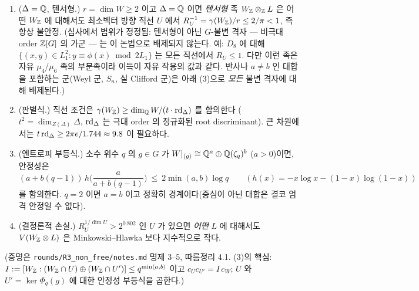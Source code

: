 \begin{proposition}[No-go 정리들]\label{prop:nogo}\tagP
\begin{enumerate}
\item ($\Delta=\mathbb{Q}$, 텐서형.) $r=\dim W\ge2$ 이고 $\Delta=\mathbb{Q}$ 이면 \emph{텐서형} 족 $W_{\mathbb{Z}}\otimes_{\mathbb{Z}} L$ 은 어떤 $W_{\mathbb{Z}}$ 에 대해서도 최소벡터 방향 직선 $U$ 에서 $R_U^{-1}=\gamma(W_{\mathbb{Z}})/r\le 2/\pi<1$, 즉 항상 불안정. (심사에서 범위가 정정됨: 텐서형이 아닌 $G$-불변 격자 --- 비극대 order $\mathbb{Z}[G]$ 의 가군 --- 는 이 논법으로 배제되지 않는다. 예: $D_8$ 에 대해 $\{(x,y)\in L_1^2: y\equiv\phi(x)\bmod 2L_1\}$ 는 모든 직선에서 $R_U\le1$. 다만 이런 족은 자유 $\mu_4$/$\mu_6$ 족의 부분족이라 이득이 자유 작용의 값과 같다. 반사나 $a\ne b$ 인 대합을 포함하는 군(Weyl 군, $S_n$, 실 Clifford 군)은 아래 (3)으로 \emph{모든} 불변 격자에 대해 배제된다.)
\item (판별식.) 직선 조건은 $\gamma(W_{\mathbb{Z}})\ge\dim_{\mathbb{Q}} W/(t\cdot\mathrm{rd}_\Delta)$ 를 함의한다 ($t^2=\dim_{Z(\Delta)}\Delta$, $\mathrm{rd}_\Delta$ 는 극대 order 의 정규화된 root discriminant). 큰 차원에서는 $t\,\mathrm{rd}_\Delta\ge 2\pi e/1.744\approx 9.8$ 이 필요하다.
\item (엔트로피 부등식.) 소수 위수 $q$ 의 $g\in G$ 가 $W|_{\langle g\rangle}\cong\mathbb{Q}^a\oplus\mathbb{Q}(\zeta_q)^b$ ($a>0$)이면, 안정성은
\[(a+b(q-1))\,h\!\Big(\frac a{a+b(q-1)}\Big)\ \le\ 2\min(a,b)\log q\qquad(h(x)=-x\log x-(1-x)\log(1-x))\]
를 함의한다. $q=2$ 이면 $a=b$ 이고 정확히 경계이다(중심이 아닌 대합은 결코 엄격 안정일 수 없다).
\item (결정론적 손실.) $R_U^{1/\dim U}>2^{0.802}$ 인 $U$ 가 있으면 \emph{어떤} $L$ 에 대해서도 $V(W_{\mathbb{Z}}\otimes L)$ 은 Minkowski--Hlawka 보다 지수적으로 작다.
\end{enumerate}
\end{proposition}
(증명은 \texttt{rounds/R3\_non\_free/notes.md} 명제 3--5, 따름정리 4.1. (3)의 핵심: $I:=[W_{\mathbb{Z}}:(W_{\mathbb{Z}}\cap U)\oplus(W_{\mathbb{Z}}\cap U')]\le q^{\min(a,b)}$ 이고 $c_Uc_{U'}=I\,c_W$; $U$ 와 $U'=\ker\Phi_q(g)$ 에 대한 안정성 부등식을 곱한다.)

